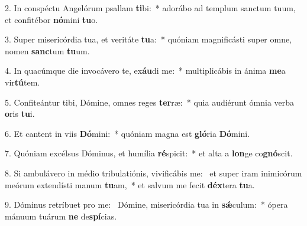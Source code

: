 2. In conspéctu Angelórum psallam \textbf{ti}bi:~*  adorábo ad templum sanctum tuum, et confitébor \textbf{nó}mini \textbf{tu}o.\

3. Super misericórdia tua, et veritáte \textbf{tu}a:~*  quóniam magnificásti super omne, nomen \textbf{sanc}tum \textbf{tu}um.\

4. In quacúmque die invocávero te, ex\textbf{áu}di me:~*  multiplicábis in ánima \textbf{me}a vir\textbf{tú}tem.\

5. Confiteántur tibi, Dómine, omnes reges \textbf{ter}ræ:~*  quia audiérunt ómnia verba \textbf{o}ris \textbf{tu}i.\

6. Et cantent in viis \textbf{Dó}mini:~*  quóniam magna est \textbf{gló}ria \textbf{Dó}mini.\

7. Quóniam excélsus Dóminus, et humília \textbf{ré}spicit:~*  et alta a \textbf{lon}ge co\textbf{gnó}scit.\

8. Si ambulávero in médio tribulatiónis, vivificábis me: \dag\  et super iram inimicórum meórum extendísti manum \textbf{tu}am,~*  et salvum me fecit \textbf{déx}tera \textbf{tu}a.\

9. Dóminus retríbuet pro me: \dag\  Dómine, misericórdia tua in \textbf{sǽ}culum:~*  ópera mánuum tuárum \textbf{ne} de\textbf{spí}cias.\

